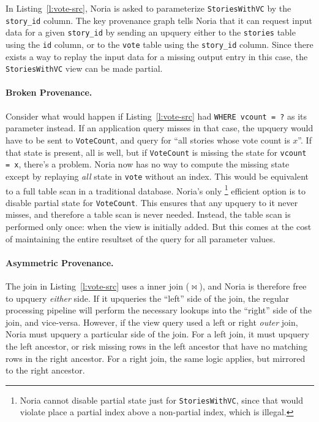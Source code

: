 In Listing~\ref{l:vote-src}, Noria is asked to parameterize
\texttt{StoriesWithVC} by the \texttt{story\_id} column. The key provenance
graph tells Noria that it can request input data for a given \texttt{story\_id}
by sending an upquery either to the \texttt{stories} table using the \texttt{id}
column, or to the \texttt{vote} table using the \texttt{story\_id} column. Since
there exists a way to replay the input data for a missing output entry in this
case, the \texttt{StoriesWithVC} view can be made partial.

\paragraph{Broken Provenance.}
Consider what would happen if Listing~\ref{l:vote-src} had \texttt{WHERE vcount
= ?} as its parameter instead. If an application query misses in that case, the
upquery would have to be sent to \texttt{VoteCount}, and query for ``all stories
whose vote count is $x$''. If that state is present, all is well, but if
\texttt{VoteCount} is missing the state for \texttt{vcount = x}, there's a
problem. Noria now has no way to compute the missing state except by replaying
\emph{all} state in \texttt{vote} without an index. This would be equivalent to
a full table scan in a traditional database.
Noria's only%
%
\footnote{Noria cannot disable partial state just for \texttt{StoriesWithVC},
since that would violate place a partial index above a non-partial index, which
is illegal.}
%
efficient option is to disable partial
state for \texttt{VoteCount}. This ensures that any upquery to it never misses,
and therefore a table scan is never needed. Instead, the table scan is performed
only once: when the view is initially added. But this comes at the cost of
maintaining the entire resultset of the query for all parameter values.

\paragraph{Asymmetric Provenance.}
The join in Listing~\ref{l:vote-src} uses a inner join ($\bowtie$), and Noria is
therefore free to upquery \emph{either} side. If it upqueries the ``left'' side
of the join, the regular processing pipeline will perform the necessary lookups
into the ``right'' side of the join, and vice-versa. However, if the view query
used a left or right \emph{outer} join, Noria must upquery a particular side of
the join. For a left join, it must upquery the left ancestor, or risk missing
rows in the left ancestor that have no matching rows in the right ancestor. For
a right join, the same logic applies, but mirrored to the right ancestor.

